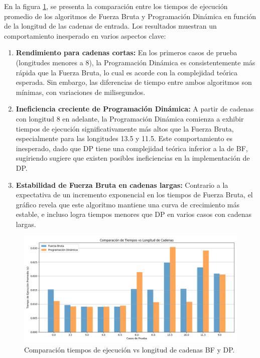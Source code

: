 \noindent En la figura \cref{timeVsLen}, se presenta la comparación entre los tiempos de ejecución promedio de los algoritmos de Fuerza Bruta y Programación Dinámica en función de la longitud de las cadenas de entrada. Los resultados muestran un comportamiento inesperado en varios aspectos clave:

\begin{enumerate}
    \item \textbf{Rendimiento para cadenas cortas:} En los primeros casos de prueba (longitudes menores a 8), la Programación Dinámica es consistentemente más rápida que la Fuerza Bruta, lo cual es acorde con la complejidad teórica esperada. Sin embargo, las diferencias de tiempo entre ambos algoritmos son mínimas, con variaciones de milisegundos.
    
    \item \textbf{Ineficiencia creciente de Programación Dinámica:} A partir de cadenas con longitud 8 en adelante, la Programación Dinámica comienza a exhibir tiempos de ejecución significativamente más altos que la Fuerza Bruta, especialmente para las longitudes 13.5 y 11.5. Este comportamiento es inesperado, dado que DP tiene una complejidad teórica inferior a la de BF, sugiriendo sugiere que existen posibles ineficiencias en la implementación de DP.
    
    \item \textbf{Estabilidad de Fuerza Bruta en cadenas largas:} Contrario a la expectativa de un incremento exponencial en los tiempos de Fuerza Bruta, el gráfico revela que este algoritmo mantiene una curva de crecimiento más estable, e incluso logra tiempos menores que DP en varios casos con cadenas largas.
\end{enumerate}

\begin{figure}[H]
    \centering
    \includegraphics[width=\textwidth]{images/execution_times_vs_length.png}
    \caption{Comparación tiempos de ejecución vs longitud de cadenas BF y DP.}
    \label{timeVsLen}
\end{figure}